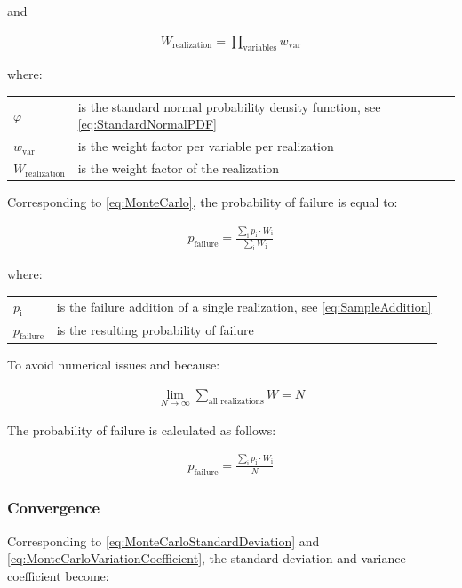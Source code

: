 and

\begin{align} 
\label{eq:ImportanceSamplingWeight}
W_{\text{realization}} = \prod_{\text{variables}} w_{\text{var}}
\end{align}

where:

\begin{longtable}{p{16mm}p{\textwidth-24pt-16mm}}  
	$\varphi$ & is the standard normal probability density function, see \autoref{eq:StandardNormalPDF} \\  
	$w_{\text{var}}$ & is the weight factor per variable per realization \\
	$W_{\text{realization}}$ & is the weight factor of the realization
\end{longtable}

Corresponding to \autoref{eq:MonteCarlo}, the probability of failure is equal to:

\begin{align}  
\label{eq:ImportanceSampling}
p_{\text{failure}} = \frac{\sum_{\text{i}} p_{\text{i}} \cdot W_{\text{i}}}{\sum_{\text{i}} W_{\text{i}}}
\end{align}

where:

\begin{longtable}{p{16mm}p{\textwidth-24pt-16mm}}  
	$p_{\text{i}}$ & is the failure addition of a single realization, see \autoref{eq:SampleAddition} \\  
	$p_{\text{failure}}$ & is the resulting probability of failure
\end{longtable}To avoid numerical issues and because:

\begin{align} 
\label{eq:ImportanceSamplingLimit}
\lim_{N \to \infty} {\sum_{\text{all realizations}} W} = N
\end{align}

The probability of failure is calculated as follows:

\begin{align} 
\label{eq:ImportanceSamplingCalculated}
p_{\text{failure}} = \frac{\sum_{\text{i}} p_{\text{i}} \cdot W_{\text{i}}}{N}
\end{align}

\subsubsection{Convergence}

Corresponding to \autoref{eq:MonteCarloStandardDeviation} and \autoref{eq:MonteCarloVariationCoefficient}, the standard deviation and variance coefficient become:

